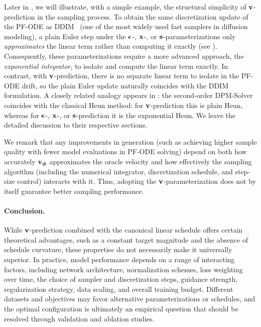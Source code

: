 Later in , we will illustrate, with a simple example, 
the structural simplicity of ${\mathbf{v}}$-prediction in the sampling process. 
To obtain the same discretization update of the PF-ODE as DDIM~\citep{song2020denoising} 
(one of the most widely used fast samplers in diffusion modeling), 
a plain Euler step under the ${\bm{\epsilon}}$-, ${\mathbf{x}}$-, or ${\mathbf{s}}$-parameterizations only 
\emph{approximates} the linear term rather than computing it exactly 
(see ). Consequently, these parameterizations require a more advanced approach, 
the \emph{exponential integrator}, to isolate and compute the linear term exactly. 
In contrast, with ${\mathbf{v}}$-prediction, there is no separate linear term to isolate 
in the PF-ODE drift, so the plain Euler update naturally coincides with the DDIM formulation.  A closely related analogy appears in : the second-order DPM-Solver~\citep{lu2022dpm} 
coincides with the classical Heun method: for ${\mathbf{v}}$-prediction this is plain Heun,  
whereas for ${\bm{\epsilon}}$-, ${\mathbf{x}}$-, or ${\mathbf{s}}$-prediction it is the  exponential Heun. We leave the detailed discussion to their respective sections.



We remark that any improvements in generation (such as achieving higher sample quality 
with fewer model evaluations in PF-ODE solving) depend on both how accurately 
${\mathbf{v}}_{{\bm{\phi}}}$ approximates the oracle velocity and how effectively the sampling 
algorithm (including the numerical integrator, discretization schedule, and step-size 
control) interacts with it. Thus, adopting the ${\mathbf{v}}$-parameterization 
does not by itself guarantee better sampling performance.







\paragraph{Conclusion.}
While ${\mathbf{v}}$-prediction combined with the canonical linear schedule offers certain theoretical advantages, such as a constant target magnitude and the absence of schedule curvature, these properties do not necessarily make it universally superior. In practice, model performance depends on a range of interacting factors, including network architecture, normalization schemes, loss weighting over time, the choice of sampler and discretization steps, guidance strength, regularization strategy, data scaling, and overall training budget. Different datasets and objectives may favor alternative parameterizations or schedules, and the optimal configuration is ultimately an empirical question that should be resolved through validation and ablation studies.




